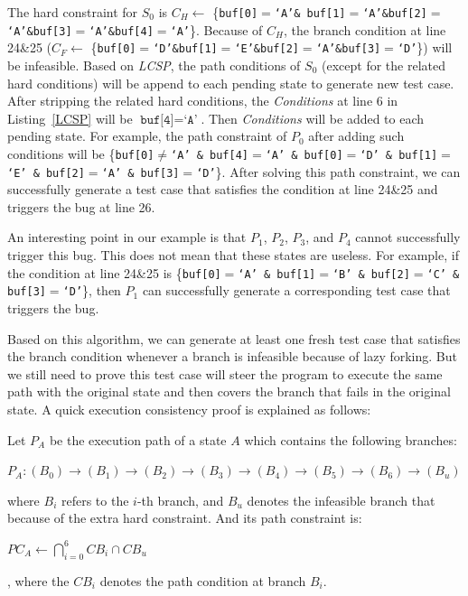 The hard constraint for $S_0$ is $C_{H}\leftarrow$ \{\texttt{buf[0]$=$`A'\& buf[1]$=$`A'\&buf[2]$=$`A'\&buf[3]$=$`A'\&buf[4]$=$`A'}\}. 
 Because of $C_{H}$, the branch condition at line 24\&25 ($C_{F}\leftarrow$ \{\texttt{buf[0]$=$`D'\&buf[1]$=$`E'\&buf[2]$=$`A'\&buf[3]$=$`D'}\}) will be infeasible.
Based on \textit{LCSP}, the path conditions of $S_0$ (except for the related hard conditions) will be append to each pending state to generate new test case. 
After stripping the related hard conditions, the \textit{Conditions} at line 6 in Listing~\ref{LCSP} will be $\texttt{buf[4]}=\texttt{`A'}$. 
Then \textit{Conditions} will be added to each pending state. For example, the path constraint of $P_0$ after adding such conditions will be \{\texttt{buf[0]$\neq$`A' \& buf[4]$=$`A' \& buf[0]$=$`D' \& buf[1]$=$`E' \& buf[2]$=$`A' \& buf[3]$=$`D'}\}. After solving this path constraint, we can successfully generate a test case that satisfies the condition at line 24\&25 and triggers the bug at line 26. 

An interesting point in our example is that $P_1$, $P_2$, $P_3$, and $P_4$ cannot successfully trigger this bug. This does not mean that these states are useless. 
 For example, if the condition at line 24\&25 is \{\texttt{buf[0]$=$`A' \& buf[1]$=$`B' \& buf[2]$=$`C' \& buf[3]$=$`D'}\}, then $P_1$ can successfully generate a corresponding test case that triggers the bug.

Based on this algorithm, we can generate at least one fresh test case that satisfies the branch condition whenever a branch is infeasible because of lazy forking. But we still need to prove this test case will steer the program to execute the same path with the original state and then covers the branch that fails in the original state. A quick execution consistency proof is explained as follows:

Let $P_A$ be the execution path of a state $A$ which contains the following branches:
\begin{center}
$P_A:(B_0) \rightarrow (B_1) \rightarrow (B_2) \rightarrow (B_3) \rightarrow (B_4) \rightarrow (B_5) \rightarrow (B_6) \rightarrow (B_u)$
\end{center}

\noindent where $B_i$ refers to the $i$-th branch, and $B_u$ denotes the infeasible branch that because of the extra hard constraint.
And its path constraint is:
\begin{center}
$PC_A\leftarrow \displaystyle \bigcap\limits_{i=0}^{6} CB_i \cap CB_u$
\end{center}
, where the $CB_i$ denotes the path condition at branch $B_i$.

